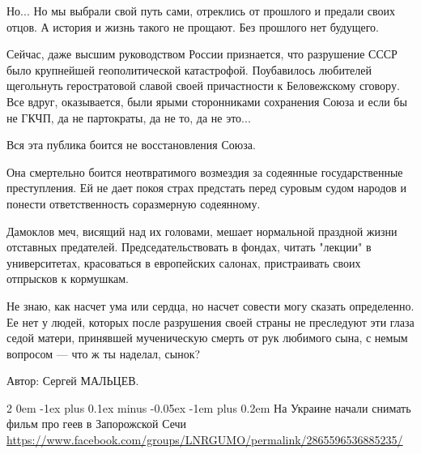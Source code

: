 \documentclass[a4paper,11pt]{extreport}
\makeatletter
\renewcommand\subsection{%
  \clearpage
    \@startsection{subsection}%
    {2}%
    {0em}%
    {-1ex plus 0.1ex minus -0.05ex}%
    {-1em plus 0.2em}%
    {\scshape\bfseries\Large}%
}
\makeatother
\begin{document}
Но... Но мы выбрали свой путь сами, отреклись от прошлого и предали своих
отцов. А история и жизнь такого не прощают. Без прошлого нет будущего.

Сейчас, даже высшим руководством России признается, что разрушение СССР было
крупнейшей геополитической катастрофой. Поубавилось любителей щегольнуть
геростратовой славой своей причастности к Беловежскому сговору. Все вдруг,
оказывается, были ярыми сторонниками сохранения Союза и если бы не ГКЧП, да не
партократы, да не то, да не это...

Вся эта публика боится не восстановления Союза.

Она смертельно боится неотвратимого возмездия за содеянные государственные
преступления. Ей не дает покоя страх предстать перед суровым судом народов и
понести ответственность соразмерную содеянному.

Дамоклов меч, висящий над их головами, мешает нормальной праздной жизни
отставных предателей. Председательствовать в фондах, читать "лекции" в
университетах, красоваться в европейских салонах, пристраивать своих отпрысков
к кормушкам.

Не знаю, как насчет ума или сердца, но насчет совести могу сказать определенно.
Ее нет у людей, которых после разрушения своей страны не преследуют эти глаза
седой матери, принявшей мученическую смерть от рук любимого сына, с немым
вопросом --- что ж ты наделал, сынок?

Автор: Сергей МАЛЬЦЕВ.


 
 
  
 
 

\subsection{На Украине начали снимать фильм про геев в Запорожской Сечи}
\label{sec:21_07_2020.fb.lnr.3}
\url{https://www.facebook.com/groups/LNRGUMO/permalink/2865596536885235/}
  
\end{document}
